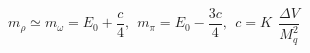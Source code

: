 \begin{equation}                              
m_{\rho} \simeq m_{\omega} = E_{0} + \frac{c}{4},~~                                                             
m_{\pi}= E_{0} - \frac{3c}{4}, ~~c = K~~ \frac{\Delta V}{M_{q}^{2}}
\end{equation}

